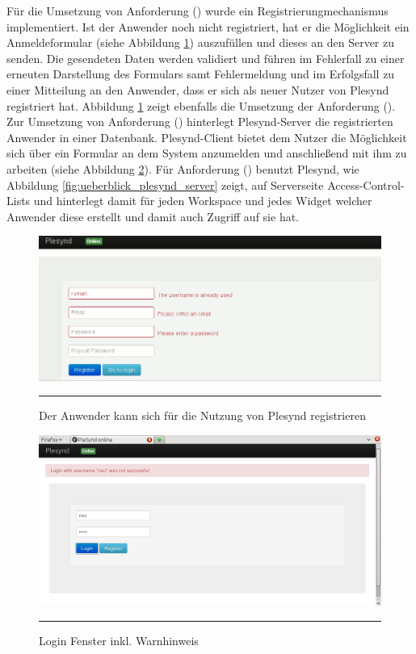 Für die Umsetzung von Anforderung  (\emph{\requirementRegistrieren}) wurde ein Registrierungmechanismus implementiert. Ist der Anwender noch nicht registriert, hat er die Möglichkeit ein Anmeldeformular (siehe Abbildung \ref{fig:plesynd_register}) auszufüllen und dieses an den Server zu senden. Die gesendeten Daten werden validiert und führen im Fehlerfall zu einer erneuten Darstellung des Formulars samt Fehlermeldung und im Erfolgsfall zu einer Mitteilung an den Anwender, dass er sich als neuer Nutzer von Plesynd registriert hat. Abbildung \ref{fig:plesynd_register} zeigt ebenfalls die Umsetzung der Anforderung  (\emph{\requirementUniqueLoginEmail}).
Zur Umsetzung von Anforderung  (\emph{\requirementLogin}) hinterlegt Plesynd-Server die registrierten Anwender in einer Datenbank. Plesynd-Client bietet dem Nutzer die Möglichkeit sich über ein Formular an dem System anzumelden und anschließend mit ihm zu arbeiten (siehe Abbildung \ref{fig:plesynd_login}). Für Anforderung  (\emph{\requirementZugriffAufEigeneWidgets}) benutzt Plesynd, wie Abbildung \ref{fig:ueberblick_plesynd_server} zeigt, auf Serverseite Access-Control-Lists und hinterlegt damit für jeden Workspace und jedes Widget welcher Anwender diese erstellt und damit auch Zugriff auf sie hat.  
\begin{figure}[H]
  \centering
  \includegraphics[width=\textwidth]{./Figures/plesynd_register.png}
    \rule{35em}{0.5pt}
  \caption[Plesynd User"=Interface: Registrieren]{Der Anwender kann sich für die Nutzung von Plesynd registrieren}
  \label{fig:plesynd_register}
\end{figure}
\begin{figure}[H]
  \centering
  \includegraphics[width=\textwidth]{./Figures/plesynd_login.png}
    \rule{35em}{0.5pt}
  \caption[Plesynd User"=Interface: Login]{Login Fenster inkl. Warnhinweis}
  \label{fig:plesynd_login}
\end{figure}
